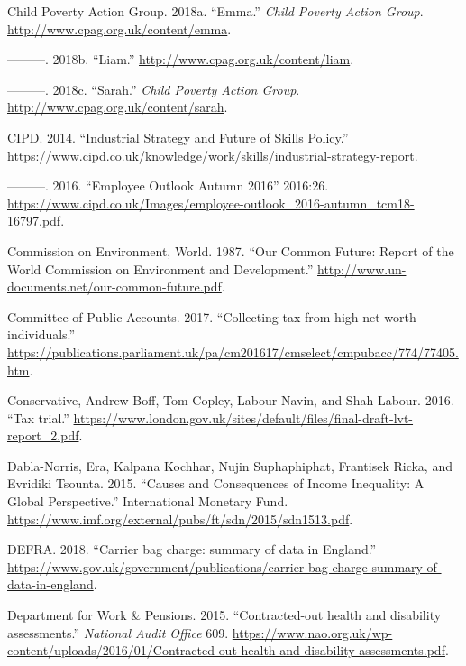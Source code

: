 \documentclass[]{tufte-handout}
\begin{document}
\leavevmode\hypertarget{ref-ChildPovertyActionGroupb}{}%
Child Poverty Action Group. 2018a. ``Emma.'' \emph{Child Poverty Action
Group}. \url{http://www.cpag.org.uk/content/emma}.

\leavevmode\hypertarget{ref-ChildPovertyActionGroupa}{}%
---------. 2018b. ``Liam.'' \url{http://www.cpag.org.uk/content/liam}.

\leavevmode\hypertarget{ref-ChildPovertyActionGroup}{}%
---------. 2018c. ``Sarah.'' \emph{Child Poverty Action Group}.
\url{http://www.cpag.org.uk/content/sarah}.

\leavevmode\hypertarget{ref-CIPD2014}{}%
CIPD. 2014. ``Industrial Strategy and Future of Skills Policy.''
\url{https://www.cipd.co.uk/knowledge/work/skills/industrial-strategy-report}.

\leavevmode\hypertarget{ref-CIPD2016}{}%
---------. 2016. ``Employee Outlook Autumn 2016'' 2016:26.
\url{https://www.cipd.co.uk/Images/employee-outlook_2016-autumn_tcm18-16797.pdf}.

\leavevmode\hypertarget{ref-CommissiononEnvironment}{}%
Commission on Environment, World. 1987. ``Our Common Future: Report of
the World Commission on Environment and Development.''
\url{http://www.un-documents.net/our-common-future.pdf}.

\leavevmode\hypertarget{ref-HoC2017}{}%
Committee of Public Accounts. 2017. ``Collecting tax from high net worth
individuals.''
\url{https://publications.parliament.uk/pa/cm201617/cmselect/cmpubacc/774/77405.htm}.

\leavevmode\hypertarget{ref-Conservative2016}{}%
Conservative, Andrew Boff, Tom Copley, Labour Navin, and Shah Labour.
2016. ``Tax trial.''
\url{https://www.london.gov.uk/sites/default/files/final-draft-lvt-report_2.pdf}.

\leavevmode\hypertarget{ref-Dabla-Norris2015}{}%
Dabla-Norris, Era, Kalpana Kochhar, Nujin Suphaphiphat, Frantisek Ricka,
and Evridiki Tsounta. 2015. ``Causes and Consequences of Income
Inequality: A Global Perspective.'' International Monetary Fund.
\url{https://www.imf.org/external/pubs/ft/sdn/2015/sdn1513.pdf}.

\leavevmode\hypertarget{ref-DEFRA2018}{}%
DEFRA. 2018. ``Carrier bag charge: summary of data in England.''
\url{https://www.gov.uk/government/publications/carrier-bag-charge-summary-of-data-in-england}.

\leavevmode\hypertarget{ref-DeptForWorkAndPensions2015}{}%
Department for Work \& Pensions. 2015. ``Contracted-out health and
disability assessments.'' \emph{National Audit Office} 609.
\url{https://www.nao.org.uk/wp-content/uploads/2016/01/Contracted-out-health-and-disability-assessments.pdf}.
\end{document}
